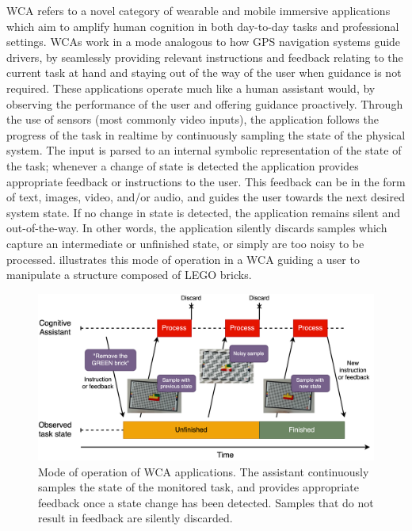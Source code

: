\gls{WCA} refers to a novel category of wearable and mobile immersive applications which aim to amplify human cognition in both day-to-day tasks and professional settings.
\glspl{WCA} work in a mode analogous to how \gls{GPS} navigation systems guide drivers, by seamlessly providing relevant instructions and feedback relating to the current task at hand and staying out of the way of the user when guidance is not required.
These applications operate much like a human assistant would, by observing the performance of the user and offering guidance proactively.
Through the use of sensors (most commonly video inputs), the application follows the progress of the task in realtime by continuously sampling the state of the physical system.
The input is parsed to an internal symbolic representation of the state of the task;
whenever a change of state is detected the application provides appropriate feedback or instructions to the user.
This feedback can be in the form of text, images, video, and/or audio, and guides the user towards the next desired system state.
If no change in state is detected, the application remains silent and out-of-the-way.
In other words, the application silently discards samples which capture an intermediate or unfinished state, or simply are too noisy to be processed.
 illustrates this mode of operation in a \gls{WCA} guiding a user to manipulate a structure composed of LEGO bricks.

\begin{figure}
    \centering
    \includegraphics[width=.9\textwidth]{Figs/wca_state}
    \caption{%
        Mode of operation of \acs{WCA} applications.
        The assistant continuously samples the state of the monitored task, and provides appropriate feedback once a state change has been detected.
        Samples that do not result in feedback are silently discarded.
    }\label{fig:wca}
\end{figure}

